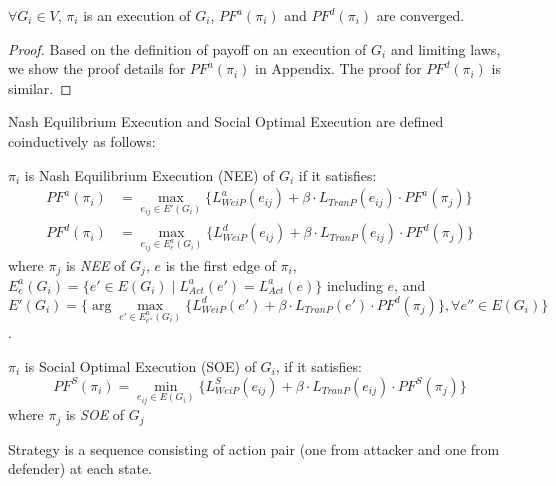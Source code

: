 \documentclass{acm_proc_article-sp}
\begin{document}
\begin{Theorem}
\label{payoffconverged}
$\forall G_{\textit{i}}\in V$, $\pi_{\textit{i}}$ is an execution of $G_{\textit{i}}$, $PF^a(\pi_{\textit{i}})$ and  $PF^d(\pi_{\textit{i}})$ are converged.
\end{Theorem}
\begin{proof}
Based on the definition of payoff on an execution of $G_{\textit{i}}$ and limiting laws, we show the proof details for $PF^a(\pi_{\textit{i}})$ in Appendix. The proof for $PF^d(\pi_{\textit{i}})$ is similar.
\end{proof}
Nash Equilibrium Execution and Social Optimal Execution are defined coinductively \cite{davide07} as follows:
\begin{definition}
$\pi_{\textit{i}}$ is \textsf{Nash Equilibrium Execution (NEE)} of $G_{\textit{i}}$ if it satisfies:
\begin{align*}
PF^a(\pi_{\textit{i}})&=\underset{e_{\textit{ij}}\in E'(G_{\textit{i}})}{\max}\{L_{\textit{WeiP}}^a({e_{\textit{ij}}})+ \beta\cdot L_{\textit{TranP}}(e_{\textit{ij}})\cdot PF^a(\pi_{\textit{j}})\} \\
PF^d(\pi_{\textit{i}})&=\underset{e_{\textit{ij}}\in E^a_{e}(G_{\textit{i}})}{\max}\{L_{\textit{WeiP}}^d({e_{\textit{ij}}})+ \beta\cdot L_{\textit{TranP}}(e_{\textit{ij}})\cdot PF^d(\pi_{\textit{j}}) \}
\end{align*}
where $\pi_{\textit{j}}$ is \textit{NEE} of $G_{\textit{j}}$, $e$ is the first edge of $\pi_{\textit{i}}$, $E^a_{e}(G_{\textit{i}})=\{e'\in E(G_{\textit{i}})\mid L_{\textit{Act}}^a(e')=L_{\textit{Act}}^a(e)\}$ including $e$, and  $E'(G_{\textit{i}})=\{\arg\underset{e'\in E^a_{e''}(G_{\textit{i}})}{\max}\{L_{\textit{WeiP}}^d(e')+ \beta\cdot L_{\textit{TranP}}(e')\cdot PF^d(\pi_{\textit{j}})\}, \forall e''\in E(G_{\textit{i}})\}$.
\end{definition}

\begin{definition}
$\pi_{\textit{i}}$ is \textsf{Social Optimal Execution (SOE)} of $G_{\textit{i}}$, if it satisfies:
$$PF^{\textit{S}}(\pi_{\textit{i}})=\underset{e_{\textit{ij}}\in E(G_{\textit{i}})}{\min}\{L_{\textit{WeiP}}^S({e_{\textit{ij}}})+ \beta\cdot L_{\textit{TranP}}(e_{\textit{ij}})\cdot PF^S(\pi_{\textit{j}}) \}$$
where $\pi_{\textit{j}}$ is \textit{SOE} of $G_{\textit{j}}$
\end{definition}

\begin{definition}
\textsf{Strategy} is a sequence consisting of action pair (one from attacker and one from defender) at each state.
\end{definition}
\end{document}
